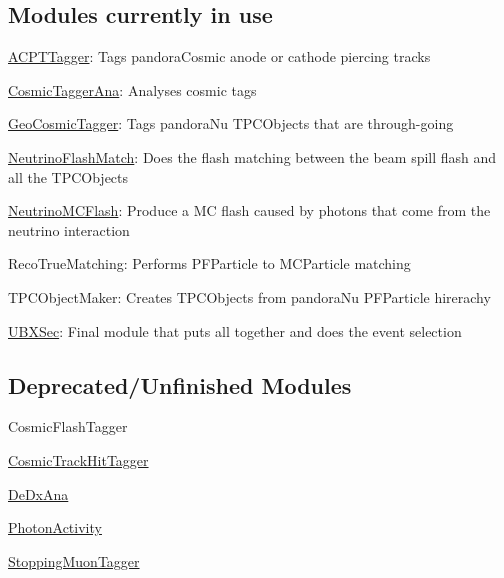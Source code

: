 \subsection*{Modules currently in use}


\begin{DoxyItemize}
\item \hyperlink{classACPTTagger}{A\-C\-P\-T\-Tagger}\-: Tags pandora\-Cosmic anode or cathode piercing tracks
\item \hyperlink{classCosmicTaggerAna}{Cosmic\-Tagger\-Ana}\-: Analyses cosmic tags
\item \hyperlink{classGeoCosmicTagger}{Geo\-Cosmic\-Tagger}\-: Tags pandora\-Nu T\-P\-C\-Objects that are through-\/going
\item \hyperlink{classNeutrinoFlashMatch}{Neutrino\-Flash\-Match}\-: Does the flash matching between the beam spill flash and all the T\-P\-C\-Objects
\item \hyperlink{classNeutrinoMCFlash}{Neutrino\-M\-C\-Flash}\-: Produce a M\-C flash caused by photons that come from the neutrino interaction
\item Reco\-True\-Matching\-: Performs P\-F\-Particle to M\-C\-Particle matching
\item T\-P\-C\-Object\-Maker\-: Creates T\-P\-C\-Objects from pandora\-Nu P\-F\-Particle hirerachy
\item \hyperlink{classUBXSec}{U\-B\-X\-Sec}\-: Final module that puts all together and does the event selection
\end{DoxyItemize}

\subsection*{Deprecated/\-Unfinished Modules}


\begin{DoxyItemize}
\item Cosmic\-Flash\-Tagger
\item \hyperlink{classCosmicTrackHitTagger}{Cosmic\-Track\-Hit\-Tagger}
\item \hyperlink{classDeDxAna}{De\-Dx\-Ana}
\item \hyperlink{classPhotonActivity}{Photon\-Activity}
\item \hyperlink{classStoppingMuonTagger}{Stopping\-Muon\-Tagger} 
\end{DoxyItemize}